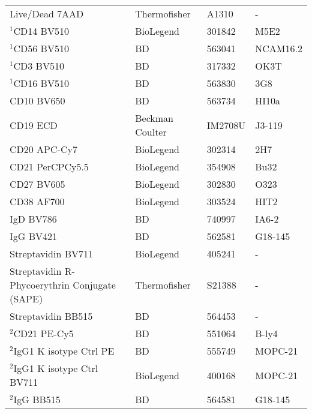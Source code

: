 \documentclass{article}%
\begin{document}
\begin{longtable}{p{4cm}p{4cm}p{4cm}p{3cm}}
\bottomrule
\endlastfoot
                               Live/Dead 7AAD &    Thermofisher &          A1310 &        - \\
                               $^1$CD14 BV510 &       BioLegend &         301842 &     M5E2 \\
                               $^1$CD56 BV510 &              BD &         563041 & NCAM16.2 \\
                                $^1$CD3 BV510 &              BD &         317332 &     OK3T \\
                               $^1$CD16 BV510 &              BD &         563830 &      3G8 \\
                                   CD10 BV650 &              BD &         563734 &    HI10a \\
                                     CD19 ECD & Beckman Coulter &        IM2708U &   J3-119 \\
                                 CD20 APC-Cy7 &       BioLegend &         302314 &      2H7 \\
                              CD21 PerCPCy5.5 &       BioLegend &         354908 &     Bu32 \\
                                   CD27 BV605 &       BioLegend &         302830 &     O323 \\
                                   CD38 AF700 &       BioLegend &         303524 &     HIT2 \\
                                    IgD BV786 &              BD &         740997 &    IA6-2 \\
                                    IgG BV421 &              BD &         562581 &  G18-145 \\
                           Streptavidin BV711 &       BioLegend &         405241 &        - \\
Streptavidin R-Phycoerythrin Conjugate (SAPE) &    Thermofisher &         S21388 &        - \\
                           Streptavidin BB515 &              BD &         564453 &        - \\
                              $^2$CD21 PE-Cy5 &              BD &         551064 &    B-ly4 \\
                   $^2$IgG1 K isotype Ctrl PE &              BD &         555749 &  MOPC-21 \\
                $^2$IgG1 K isotype Ctrl BV711 &       BioLegend &         400168 &  MOPC-21 \\
                                $^2$IgG BB515 &              BD &         564581 &  G18-145 \\
\end{longtable}
%
\begin{footnotesize}%
\textit{
}%
\end{footnotesize}%
%
\end{document}

